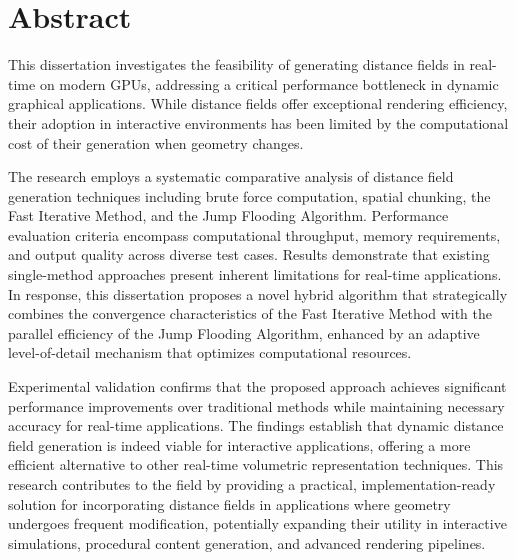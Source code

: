 \chapter*{Abstract}

This dissertation investigates the feasibility of generating distance fields in real-time on modern GPUs, addressing a
critical performance bottleneck in dynamic graphical applications. While distance fields offer exceptional rendering
efficiency, their adoption in interactive environments has been limited by the computational cost of their generation
when geometry changes.

The research employs a systematic comparative analysis of distance field generation techniques including brute force
computation, spatial chunking, the Fast Iterative Method, and the Jump Flooding Algorithm. Performance evaluation
criteria encompass computational throughput, memory requirements, and output quality across diverse test cases. Results
demonstrate that existing single-method approaches present inherent limitations for real-time applications. In response,
this dissertation proposes a novel hybrid algorithm that strategically combines the convergence characteristics of the
Fast Iterative Method with the parallel efficiency of the Jump Flooding Algorithm, enhanced by an adaptive
level-of-detail mechanism that optimizes computational resources.

Experimental validation confirms that the proposed approach achieves significant performance improvements over
traditional methods while maintaining necessary accuracy for real-time applications. The findings establish that dynamic
distance field generation is indeed viable for interactive applications, offering a more efficient alternative to other
real-time volumetric representation techniques. This research contributes to the field by providing a practical,
implementation-ready solution for incorporating distance fields in applications where geometry undergoes frequent
modification, potentially expanding their utility in interactive simulations, procedural content generation, and
advanced rendering pipelines.
